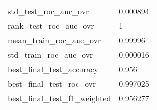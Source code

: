 \begin{tabular}{ll}
std\_test\_roc\_auc\_ovr          &                                           0.000894 \\
rank\_test\_roc\_auc\_ovr         &                                                  1 \\
mean\_train\_roc\_auc\_ovr        &                                            0.99996 \\
std\_train\_roc\_auc\_ovr         &                                           0.000016 \\
best\_final\_test\_accuracy      &                                              0.956 \\
best\_final\_test\_roc\_ovr       &                                           0.997025 \\
best\_final\_test\_f1\_weighted   &                                           0.956277 \\
\bottomrule
\end{tabular}
